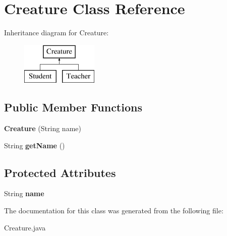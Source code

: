 \hypertarget{class_creature}{}\section{Creature Class Reference}
\label{class_creature}
Inheritance diagram for Creature\+:\begin{figure}[H]
\begin{center}
\leavevmode
\includegraphics[height=2.000000cm]{class_creature}
\end{center}
\end{figure}
\subsection*{Public Member Functions}
\begin{DoxyCompactItemize}
\item 
\hypertarget{class_creature_a2b52aa516ccf6e45b40d4647330c4741}{}{\bfseries Creature} (String name)\label{class_creature_a2b52aa516ccf6e45b40d4647330c4741}

\item 
\hypertarget{class_creature_ac71e803e8c5f1fe9e88d1b04e96ffa3b}{}String {\bfseries get\+Name} ()\label{class_creature_ac71e803e8c5f1fe9e88d1b04e96ffa3b}

\end{DoxyCompactItemize}
\subsection*{Protected Attributes}
\begin{DoxyCompactItemize}
\item 
\hypertarget{class_creature_a747f9d05acc75973336ea6e9ca126523}{}String {\bfseries name}\label{class_creature_a747f9d05acc75973336ea6e9ca126523}

\end{DoxyCompactItemize}


The documentation for this class was generated from the following file\+:\begin{DoxyCompactItemize}
\item 
Creature.\+java\end{DoxyCompactItemize}

